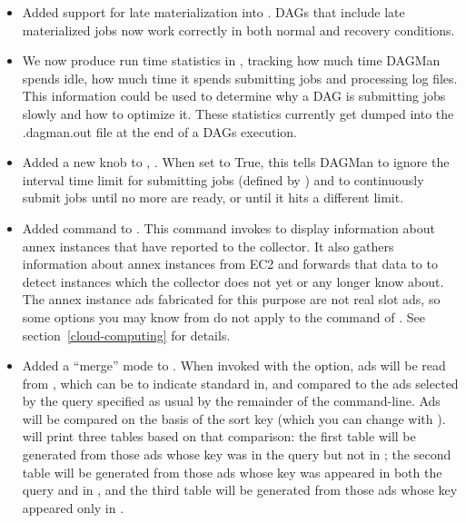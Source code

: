 \begin{itemize}

\item Added support for late materialization into . DAGs that
include late materialized jobs now work correctly in both normal and recovery
conditions.

\item We now produce run time statistics in , tracking how
much time DAGMan spends idle, how much time it spends submitting jobs and
processing log files. This information could be used to determine why a DAG
is submitting jobs slowly and how to optimize it. These statistics currently get
dumped into the .dagman.out file at the end of a DAGs execution.

\item Added a new knob to , .
When set to True, this tells DAGMan to ignore the interval time limit for
submitting jobs (defined by ) and to
continuously submit jobs until no more are ready, or until it hits a different
limit.

\item Added  command to .  This command invokes
 to display information about annex instances that have
reported to the collector.  It also gathers information about annex instances
from EC2 and forwards that data to  to detect instances which
the collector does not yet or any longer know about.  The annex instance ads
fabricated for this purpose are not real slot ads, so some options you may
know from  do not apply to the  command of
.  See section~\ref{cloud-computing} for details.

\item Added a ``merge'' mode to .  When invoked with the
 option, ads will be read from , which
can be \Expr{-} to indicate standard in, and compared to the ads selected
by the query specified as usual by the remainder of the command-line.  Ads
will be compared on the basis of the sort key (which you can change with
).   will print three tables based on
that comparison: the first table will be generated from those ads whose key
was in the query but not in ; the second table will be generated
from those ads whose key was appeared in both the query and in ,
and the third table will be generated from those ads whose key appeared
only in .


\end{itemize}
